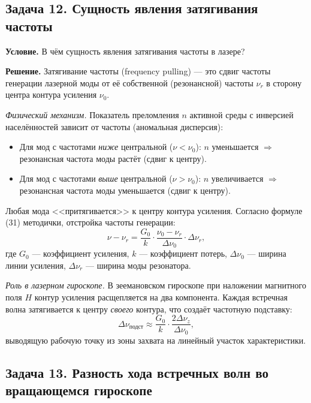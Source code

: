 \documentclass[12pt, a4paper]{article}
\begin{document}
\subsection*{Задача 12. Сущность явления затягивания частоты}

\textbf{Условие.} В чём сущность явления затягивания частоты в лазере?

\textbf{Решение.} Затягивание частоты (frequency pulling) --- это сдвиг частоты генерации лазерной моды от её собственной (резонансной) частоты $\nu_r$ в сторону центра контура усиления $\nu_0$.

\textit{Физический механизм.} Показатель преломления $n$ активной среды с инверсией населённостей зависит от частоты (аномальная дисперсия):
\begin{itemize}[leftmargin=1.5em]
    \item Для мод с частотами \textit{ниже} центральной ($\nu < \nu_0$): $n$ уменьшается $\Rightarrow$ резонансная частота моды растёт (сдвиг к центру).
    \item Для мод с частотами \textit{выше} центральной ($\nu > \nu_0$): $n$ увеличивается $\Rightarrow$ резонансная частота моды уменьшается (сдвиг к центру).
\end{itemize}
Любая мода <<притягивается>> к центру контура усиления. Согласно формуле (31) методички, отстройка частоты генерации:
\begin{equation}
    \nu - \nu_r = \frac{G_0}{k} \cdot \frac{\nu_0 - \nu_r}{\Delta \nu_0} \cdot \Delta \nu_r,
\end{equation}
где $G_0$ --- коэффициент усиления, $k$ --- коэффициент потерь, $\Delta \nu_0$ --- ширина линии усиления, $\Delta \nu_r$ --- ширина моды резонатора.

\textit{Роль в лазерном гироскопе.} В зеемановском гироскопе при наложении магнитного поля $H$ контур усиления расщепляется на два компонента. Каждая встречная волна затягивается к центру \textit{своего} контура, что создаёт частотную подставку:
\begin{equation}
    \Delta \nu_{\text{подст}} \approx \frac{G_0}{k} \cdot \frac{2 \Delta \nu_z}{\Delta \nu_0},
\end{equation}
выводящую рабочую точку из зоны захвата на линейный участок характеристики.




\subsection*{Задача 13. Разность хода встречных волн во вращающемся гироскопе}
\end{document}
